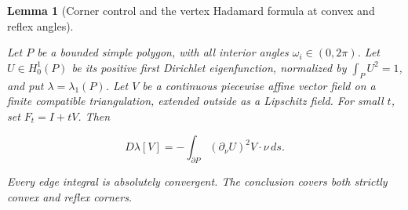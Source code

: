 \documentclass[11pt,a4paper]{article}
\theoremstyle{proofmanuscript}
\newtheorem{lemma}[theorem]{Lemma}
\begin{document}
\begin{lemma}[Corner control and the vertex Hadamard formula at convex and reflex angles]\label{lem-hadamard-corners}

Let \(P\) be a bounded simple polygon, with all interior angles \(\omega_i\in(0,2\pi)\). Let \(U\in H_0^1(P)\) be its positive first Dirichlet eigenfunction, normalized by \(\int_PU^2=1\), and put \(\lambda=\lambda_1(P)\). Let \(V\) be a continuous piecewise affine vector field on a finite compatible triangulation, extended outside as a Lipschitz field. For small \(t\), set \(F_t=I+tV\). Then

\[
D\lambda[V]=-\int_{\partial P}(\partial_\nu U)^2V\cdot\nu\,ds.
\]

Every edge integral is absolutely convergent. The conclusion covers both strictly convex and reflex corners.

\end{lemma}
\end{document}
